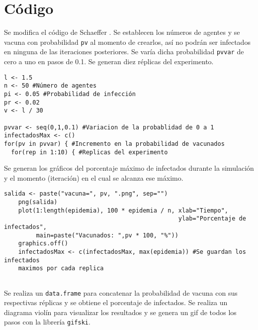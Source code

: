 \documentclass[12pt]{amsart}
\begin{document}
\section{Código}
Se modifica el código de Schaeffer \cite{codigo}. Se establecen los números de agentes y se vacuna con probabilidad \texttt{pv} al momento de crearlos, así no podrán ser infectados en ninguna de las iteraciones posteriores. Se varía dicha probabilidad \texttt{pvvar} de cero a uno en pasos de 0.1. Se generan diez réplicas del experimento.
\renewcommand{\listingscaption}{Código}
\begin{listing}[H]
  \begin{verbatim}
l <- 1.5
n <- 50 #Número de agentes
pi <- 0.05 #Probabilidad de infección
pr <- 0.02
v <- l / 30

pvvar <- seq(0,1,0.1) #Variacion de la probablidad de 0 a 1 
infectadosMax <- c()
for(pv in pvvar) { #Incremento en la probabilidad de vacunados
  for(rep in 1:10) { #Replicas del experimento 
  \end{verbatim}
  \label{codigo1}
\end{listing}
\clearpage

Se generan los gráficos del porcentaje máximo de infectados durante la simulación y el momento (iteración) en el cual se alcanza ese máximo.
\renewcommand{\listingscaption}{Código}
\begin{listing}[H]
  \begin{verbatim}
salida <- paste("vacuna=", pv, ".png", sep="")
    png(salida)
    plot(1:length(epidemia), 100 * epidemia / n, xlab="Tiempo", 
                                                 ylab="Porcentaje de infectados",
         main=paste("Vacunados: ",pv * 100, "%"))
    graphics.off()
    infectadosMax <- c(infectadosMax, max(epidemia)) #Se guardan los infectados 
    maximos por cada replica
 
  \end{verbatim}
  \label{codigo2}
\end{listing}

Se realiza un \texttt{data.frame} para concatenar la probabilidad de vacuna con sus respectivas réplicas y se obtiene el porcentaje de infectados. Se realiza un diagrama violín para visualizar los resultados y se genera un gif de todos los pasos con la librería \texttt{gifski}.
\end{document}
